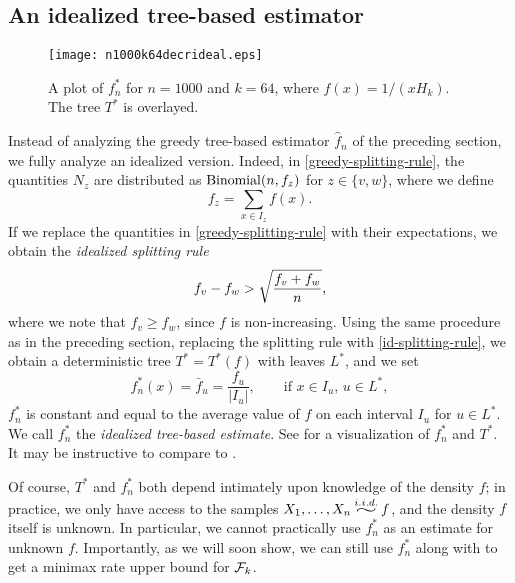 \subsection{An idealized tree-based estimator}

\begin{figure}
  \centering
  \texttt{[image: n1000k64decrideal.eps]}
  \caption{A plot of $f^*_n$ for $n = 1000$ and $k = 64$, where
    $f(x) = 1/(x H_k)$. The tree $T^*$ is overlayed.}
\end{figure}
Instead of analyzing the greedy tree-based estimator $\hat{f}_n$ of
the preceding section, we fully analyze an idealized version.
Indeed, in \eqref{greedy-splitting-rule}, the quantities $N_z$ are
distributed as $\operatorname{Binomial}(n, f_z)$ for $z \in \{v, w\}$, where we define
\[
  f_z = \sum_{x \in I_z} f(x) .
\]
If we replace the quantities in \eqref{greedy-splitting-rule} with
their expectations, we obtain the \emph{idealized splitting rule}
\begin{align}
  f_v - f_w > \sqrt{\frac{f_v + f_w}{n}} , \eqlabel{id-splitting-rule}
\end{align}
where we note that $f_v \ge f_w$, since $f$ is non-increasing. Using
the same procedure as in the preceding section, replacing the
splitting rule with \eqref{id-splitting-rule}, we obtain a
deterministic tree $T^* = T^*(f)$ with leaves $L^*$, and we set
\[
  f^*_n(x) = \bar{f}_u = \frac{f_u}{|I_u|} , \qquad \text{if } x \in I_u, \, u \in L^* ,
\]
\ie $f^*_n$ is constant and equal to the average value of $f$ on each
interval $I_u$ for $u \in L^*$. We call $f^*_n$ the \emph{idealized
  tree-based estimate}. See  for a visualization of
$f^*_n$ and $T^*$. It may be instructive to compare  to
.

Of course, $T^*$ and $f^*_n$ both depend
intimately upon knowledge of the density $f$; in practice, we only
have access to the samples $X_1, \dots, X_n \iid f$, and the density
$f$ itself is unknown. In particular, we cannot practically use
$f^*_n$ as an estimate for unknown $f$. Importantly, as we will soon
show, we can still use $f^*_n$ along with
 to get a minimax rate upper bound for
$\mathcal{F}_k$.

